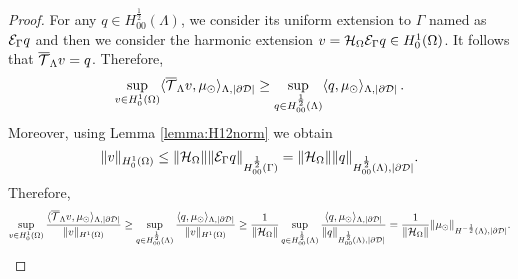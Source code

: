 \begin{proof}
For any $q \in H^{\frac 12}_{00}(\Lambda)$, we consider its uniform extension to $\Gamma$ named as $\mathcal{E}_\Gamma q$
and then we consider the harmonic extension $v=\mathcal{H}_\Omega \mathcal{E}_\Gamma q\in H^1_0(\Omega)$. It follows that ${\overline{\mathcal{T}}_\Lambda} v=q$. Therefore, 
\begin{equation*}
\sup _{v\in H^1_0(\Omega)}  \langle {\overline{\mathcal{T}}_\Lambda} v, \mu_{\odot} \rangle_{\Lambda,|\partial\mathcal{D}|} \geq\sup_{q \in H^{\frac 12}_{00}(\Lambda)} \langle q, \mu_{\odot}  \rangle_{\Lambda,|\partial\mathcal{D}|}\,.
\end{equation*}
Moreover, using Lemma \ref{lemma:H12norm} we obtain
\begin{equation*}
\|v\|_{H^1_0(\Omega)}\leq \|\mathcal{H}_\Omega\| \|\mathcal{E}_\Gamma q\|_{H^{\frac 12}_{00}(\Gamma)}  = \|\mathcal{H}_\Omega\| \|q\|_{H^{\frac 12}_{00}(\Lambda),|\partial\mathcal{D}|}.
\end{equation*}
 Therefore,
\begin{align*}
\sup _{v\in H^1_0(\Omega)} \frac{ \langle {\overline{\mathcal{T}}_\Lambda} v, \mu_{\odot} \rangle_{\Lambda,|\partial\mathcal{D}|}}{\|v\|_{H^1(\Omega)}}
\geq \sup _{q\in H^{\frac 12}_{00}(\Lambda)} \frac{ \langle q, \mu_{\odot} \rangle_{\Lambda,|\partial\mathcal{D}|}}{\|v\|_{H^1(\Omega)}}
\geq \frac{1}{\|\mathcal{H}_\Omega\|} \sup _{q\in H^{\frac 12}_{00}(\Lambda)} \frac{ \langle q, \mu_{\odot} \rangle_{\Lambda,|\partial\mathcal{D}|}}{\|q\|_{H^{\frac 12}_{00}(\Lambda),|\partial\mathcal{D}|}} 
= \frac{1}{\|\mathcal{H}_\Omega\|} \|\mu_{\odot}\|_{H^{-\frac 12}(\Lambda),|\partial\mathcal{D}|}.
\end{align*}
\end{proof}



